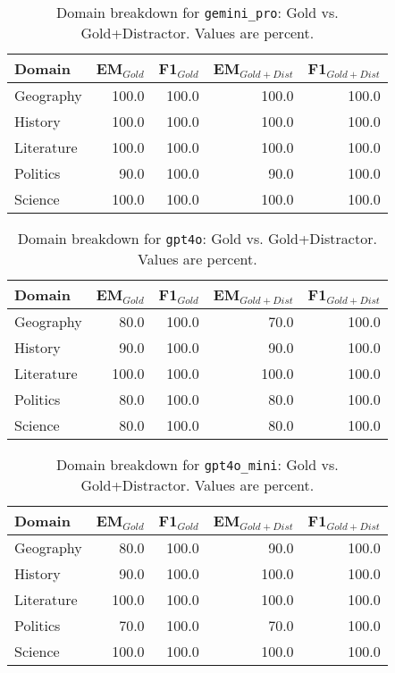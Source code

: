 \begin{table}[t]\centering
\caption{Domain breakdown for \texttt{gemini_pro}: Gold vs. Gold+Distractor. Values are percent.}
\label{tab:domain-gemini_pro}
\begin{tabular}{lrrrr}
\toprule
Domain & EM$_{Gold}$ & F1$_{Gold}$ & EM$_{Gold+Dist}$ & F1$_{Gold+Dist}$ \\
\midrule
Geography & 100.0 & 100.0 & 100.0 & 100.0 \\
History & 100.0 & 100.0 & 100.0 & 100.0 \\
Literature & 100.0 & 100.0 & 100.0 & 100.0 \\
Politics & 90.0 & 100.0 & 90.0 & 100.0 \\
Science & 100.0 & 100.0 & 100.0 & 100.0 \\
\bottomrule
\end{tabular}
\end{table}

\begin{table}[t]\centering
\caption{Domain breakdown for \texttt{gpt4o}: Gold vs. Gold+Distractor. Values are percent.}
\label{tab:domain-gpt4o}
\begin{tabular}{lrrrr}
\toprule
Domain & EM$_{Gold}$ & F1$_{Gold}$ & EM$_{Gold+Dist}$ & F1$_{Gold+Dist}$ \\
\midrule
Geography & 80.0 & 100.0 & 70.0 & 100.0 \\
History & 90.0 & 100.0 & 90.0 & 100.0 \\
Literature & 100.0 & 100.0 & 100.0 & 100.0 \\
Politics & 80.0 & 100.0 & 80.0 & 100.0 \\
Science & 80.0 & 100.0 & 80.0 & 100.0 \\
\bottomrule
\end{tabular}
\end{table}

\begin{table}[t]\centering
\caption{Domain breakdown for \texttt{gpt4o_mini}: Gold vs. Gold+Distractor. Values are percent.}
\label{tab:domain-gpt4o_mini}
\begin{tabular}{lrrrr}
\toprule
Domain & EM$_{Gold}$ & F1$_{Gold}$ & EM$_{Gold+Dist}$ & F1$_{Gold+Dist}$ \\
\midrule
Geography & 80.0 & 100.0 & 90.0 & 100.0 \\
History & 90.0 & 100.0 & 100.0 & 100.0 \\
Literature & 100.0 & 100.0 & 100.0 & 100.0 \\
Politics & 70.0 & 100.0 & 70.0 & 100.0 \\
Science & 100.0 & 100.0 & 100.0 & 100.0 \\
\bottomrule
\end{tabular}
\end{table}

